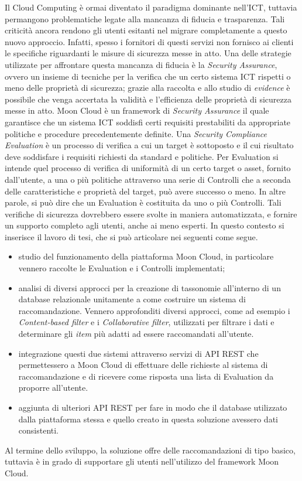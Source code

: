\documentclass[10pt,a4paper]{article}
\begin{document}
\hfill\break
Il Cloud Computing è ormai diventato il paradigma dominante nell'ICT, tuttavia permangono problematiche legate alla mancanza di fiducia e trasparenza.
Tali criticità ancora rendono gli utenti esitanti nel migrare completamente a questo nuovo approccio. Infatti, spesso i fornitori di questi servizi 
non fornisco ai clienti le specifiche riguardanti le misure di sicurezza messe in atto.\hfill\break
Una delle strategie utilizzate per affrontare questa mancanza di fiducia è la \textit{Security Assurance}, ovvero un insieme di tecniche
per la verifica che un certo sistema ICT rispetti o meno delle proprietà di sicurezza; grazie alla raccolta e allo studio di \textit{evidence} è possibile 
che venga accertata la validità e l'efficienza delle proprietà di sicurezza messe in atto.\hfill\break
%
Moon Cloud è un framework di \textit{Security Assurance} il quale garantisce che un sistema ICT soddisfi certi requisiti 
prestabiliti da appropriate politiche e procedure precedentemente definite. Una \textit{Security Compliance Evaluation} è un processo di 
verifica a cui un target è sottoposto e il cui risultato deve soddisfare i requisiti richiesti da standard e politiche. 
Per Evaluation si intende quel processo di verifica di uniformità di un certo target o asset, fornito dall'utente, a una o più politiche 
attraverso una serie di Controlli che a seconda delle caratteristiche e proprietà del target, può avere successo o meno. In altre parole, 
si può dire che un Evaluation è costituita da uno o più Controlli.\hfill\break
%
Tali verifiche di sicurezza dovrebbero essere svolte in maniera automatizzata, e fornire un supporto completo agli utenti, anche ai meno esperti.
In questo contesto si inserisce il lavoro di tesi, che si può articolare nei seguenti come segue.
\begin{itemize}
    \item studio del funzionamento della piattaforma Moon Cloud, in particolare vennero raccolte le Evaluation e i Controlli implementati;
    \item analisi di diversi approcci per la creazione di tassonomie all'interno di un database relazionale unitamente a come costruire un 
    sistema di raccomandazione. Vennero approfonditi diversi approcci, come ad esempio i \textit{Content-based filter} e i \textit{Collaborative filter}, 
    utilizzati per filtrare i dati e determinare gli \textit{item} più adatti ad essere raccomandati all'utente.
    \item integrazione questi due sistemi attraverso servizi di API REST che permettessero a Moon Cloud di effettuare delle richieste al sistema di 
    raccomandazione e di ricevere come risposta una lista di Evaluation da proporre all'utente.
    \item aggiunta di ulteriori API REST per fare in modo che il database utilizzato dalla piattaforma stessa e quello creato in questa soluzione 
    avessero dati consistenti.
\end{itemize}
%
Al termine dello sviluppo, la soluzione offre delle raccomandazioni di tipo basico, tuttavia è in grado di supportare gli utenti nell'utilizzo del framework 
Moon Cloud.
\end{document}
